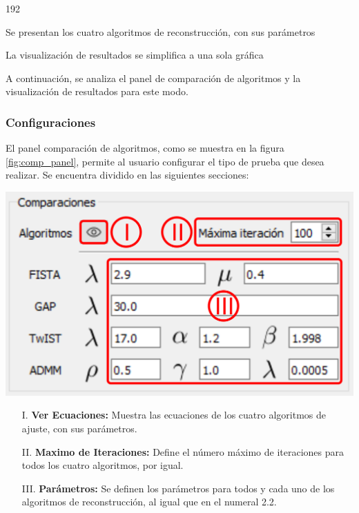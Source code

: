 \documentclass[12pt,twoside,letter]{ol-softwaremanual}
\newenvironment{Figure}
  {\par\medskip\noindent\minipage{\linewidth}}
  {\endminipage\par\medskip}
\begin{document}
\newpage
\begin{dingautolist}{192}
	\setlength\itemsep{0em}
	\item Se presentan los cuatro algoritmos de reconstrucción, con sus parámetros
	\item La visualización de resultados se simplifica a una sola gráfica
\end{dingautolist}

A continuación, se analiza el panel de comparación de algoritmos y la visualización de resultados para este modo.

\subsubsection{Configuraciones}

El panel comparación de algoritmos, como se muestra en la figura \ref{fig:comp_panel}, permite al usuario configurar el tipo de prueba que desea realizar. Se encuentra dividido en las siguientes secciones:

\begin{multicols}{2}
	
	\begin{Figure}
		\centering
		\includegraphics[width=0.9\linewidth]{comp-panel.png}
		\label{fig:comp_panel}
	\end{Figure}	
	
	\begin{itemize}
		
		\item[I.] \textbf{Ver Ecuaciones:} Muestra las ecuaciones de los cuatro algoritmos de ajuste, con sus parámetros.
		\item[II.] \textbf{Maximo de Iteraciones:} Define el número máximo de iteraciones para todos los cuatro algoritmos, por igual.
		\item[III.] \textbf{Parámetros:} Se definen los parámetros para todos y cada uno de los algoritmos de reconstrucción, al igual que en el numeral 2.2.
		
	\end{itemize}
	
\end{multicols}
\end{document}
